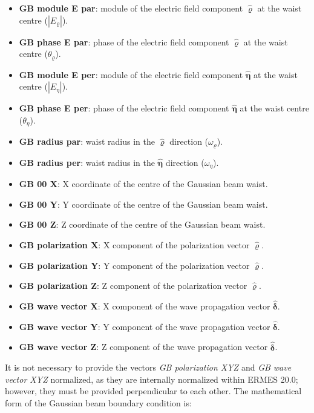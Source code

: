 \begin{itemize}\itemsep0em 
	\item \textbf{GB module E par}: module of the electric field component $\mathbf{\hat{\varrho}}$ at the waist centre ($|E_{\varrho}|$).
	\item \textbf{GB phase E par}: phase of the electric field component $\mathbf{\hat{\varrho}}$ at the waist centre ($\theta_{\varrho}$).
	\\
	\item \textbf{GB module E per}: module of the electric field component $\mathbf{\hat{\eta}}$ at the waist centre ($|E_{\eta}|$).
	\item \textbf{GB phase E per}: phase of the electric field component $\mathbf{\hat{\eta}}$ at the waist centre ($\theta_{\eta}$).
	\\
	\item \textbf{GB radius par}: waist radius in the $\mathbf{\hat{\varrho}}$ direction ($\omega_{\varrho}$).
	\item \textbf{GB radius per}: waist radius in the $\mathbf{\hat{\eta}}$ direction ($\omega_{\eta}$).
	\\
	\item \textbf{GB 00 X}: X coordinate of the centre of the Gaussian beam waist.
	\item \textbf{GB 00 Y}: Y coordinate of the centre of the Gaussian beam waist.
	\item \textbf{GB 00 Z}: Z coordinate of the centre of the Gaussian beam waist.
	\\
	\item \textbf{GB polarization X}: X component of the polarization vector $\mathbf{\hat{\varrho}}$.
	\item \textbf{GB polarization Y}: Y component of the polarization vector $\mathbf{\hat{\varrho}}$.
	\item \textbf{GB polarization Z}: Z component of the polarization vector $\mathbf{\hat{\varrho}}$.
	\\
	\item \textbf{GB wave vector X}: X component of the wave propagation vector $\mathbf{\hat{\delta}}$.
    \item \textbf{GB wave vector Y}: Y component of the wave propagation vector $\mathbf{\hat{\delta}}$.
    \item \textbf{GB wave vector Z}: Z component of the wave propagation vector $\mathbf{\hat{\delta}}$.
\end{itemize}
It is not necessary to provide the vectors \emph{GB polarization XYZ} and \emph{GB wave vector XYZ} normalized, as they are internally normalized within ERMES 20.0; however, they must be provided perpendicular to each other. The mathematical form of the Gaussian beam boundary condition is:
